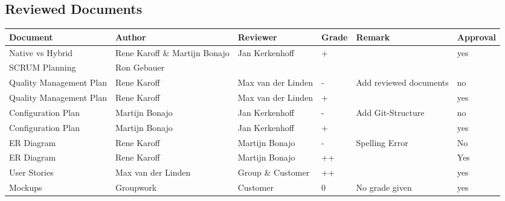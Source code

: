 \begin{landscape}
	\section*{Reviewed Documents}
	\pagestyle{plain}
	\begin{longtable}[htbp]{ l l l l l l}
		\textbf{Document} & \textbf{Author} & \textbf{Reviewer} & \textbf{Grade} & \textbf{Remark} & \textbf{Approval}\\ \hline
		Native vs Hybrid & Rene Karoff \& Martijn Bonajo & Jan Kerkenhoff &+& & yes\\
		SCRUM Planning & Ron Gebauer & & & & \\
		Quality Management Plan & Rene Karoff & Max van der Linden &-&  Add reviewed documents& no \\
		Quality Management Plan & Rene Karoff & Max van der Linden &+& & yes \\
		Configuration Plan & Martijn Bonajo & Jan Kerkenhoff &-& Add Git-Structure & no\\
		Configuration Plan & Martijn Bonajo & Jan Kerkenhoff &+&  & yes\\
		ER Diagram & Rene Karoff & Martijn Bonajo & - & Spelling Error& No\\
		ER Diagram & Rene Karoff & Martijn Bonajo &++&& Yes\\
		User Stories & Max van der Linden & Group \& Customer & ++ & & yes \\
		Mockups & Groupwork & Customer & 0 & No grade given &  yes\\
	\end{longtable}
\end{landscape}
